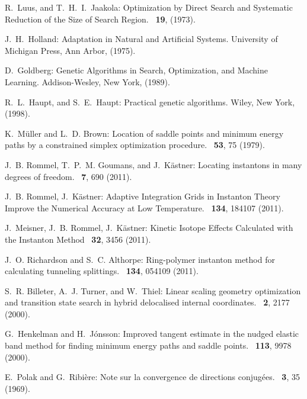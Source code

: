 \documentclass{article}
\begin{document}
\begin{thebibliography}{10}
R.~Luus, and T.~H.~I.~Jaakola:
\newblock Optimization by Direct Search and Systematic Reduction of the Size of Search Region.
~\textbf{19}, (1973).

J.~H.~Holland:
\newblock Adaptation in Natural and Artificial Systems.
\newblock University of Michigan Press, Ann
  Arbor, (1975).

D.~Goldberg:
\newblock Genetic Algorithms in Search, Optimization, and Machine Learning.
\newblock Addison-Wesley, New York, (1989).

R.~L.~Haupt, and S.~E.~Haupt:
\newblock Practical genetic algorithms.
\newblock Wiley, New York, (1998).

K.~M{\"u}ller and L.~D. Brown:
\newblock Location of saddle points and minimum energy paths by a constrained
  simplex optimization procedure.
~{\bf 53}, 75  (1979).

J.~B. Rommel, T.~P.~M. Goumans, and J.~K\"astner:
\newblock Locating instantons in many degrees of freedom.
~{\bf 7}, 690  (2011).

J.~B. Rommel, J.~K\"astner:
\newblock Adaptive Integration Grids in Instanton Theory Improve the Numerical Accuracy at Low Temperature.
~{\bf 134}, 184107 (2011).

J.~Meisner, J.~B. Rommel, J.~K\"astner:
\newblock Kinetic Isotope Effects Calculated with the Instanton Method 
~{\bf 32}, 3456 (2011).

J.~O. Richardson and S.~C. Althorpe:
\newblock Ring-polymer instanton method for calculating tunneling splittings.
~{\bf 134}, 054109  (2011).

S.~R. Billeter, A.~J. Turner, and W.~Thiel:
\newblock Linear scaling geometry optimization and transition state search in
  hybrid delocalised internal coordinates.
~{\bf 2}, 2177  (2000).

G.~Henkelman and H.~J{\'o}nsson:
\newblock Improved tangent estimate in the nudged elastic band method for
  finding minimum energy paths and saddle points.
~{\bf 113}, 9978  (2000).

E.~Polak and G.~Ribi\`ere:
\newblock Note sur la convergence de directions conjug\'ees.
~{\bf 3}, 35  (1969).


\end{thebibliography}
\end{document}
